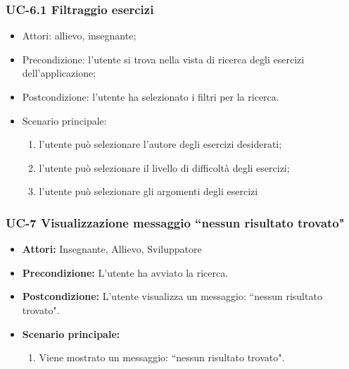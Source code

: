 \subsubsection{UC-6.1 Filtraggio esercizi }
\begin{itemize}
\item Attori: allievo, insegnante;
			\item Precondizione: l'utente si trova nella vista di ricerca degli esercizi dell'applicazione;
			\item Postcondizione: l'utente ha selezionato i filtri per la ricerca.
			\item Scenario principale:
				\begin{enumerate}
					\item l'utente può selezionare l'autore degli esercizi desiderati;
					\item l'utente può selezionare il livello di difficoltà degli esercizi;
					\item l'utente può selezionare gli argomenti degli esercizi
				\end{enumerate}

\end{itemize}
\subsubsection{UC-7 Visualizzazione messaggio ``nessun risultato trovato"}
\begin{itemize}
		\item \textbf{Attori: } Insegnante, Allievo, Sviluppatore
		
		\item \textbf{Precondizione: }L'utente ha avviato la ricerca. 
		\item \textbf{Postcondizione: }L'utente visualizza un messaggio: ``nessun risultato trovato".
		\item \textbf{Scenario principale: }
		\begin{enumerate}
			\item Viene mostrato un messaggio: ``nessun risultato trovato".
		\end{enumerate}
\end{itemize}

	
